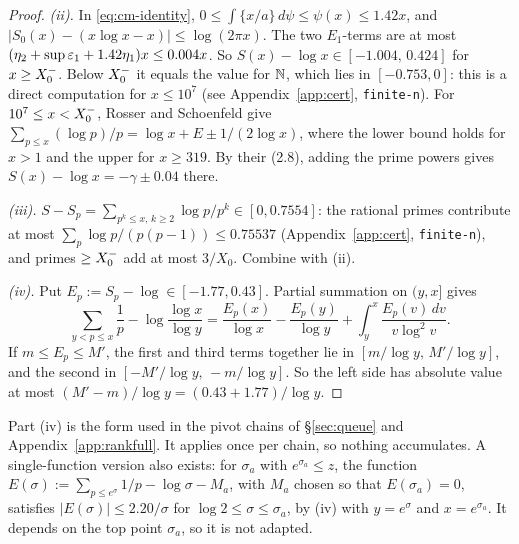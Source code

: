 \begin{proof}
\emph{(ii).} In \eqref{eq:cm-identity}, $0\le\int\{x/a\}\,d\psi\le\psi(x)\le1.42x$, and
$|S_0(x)-(x\log x-x)|\le\log(2\pi x)$. The two $E_1$-terms are at most $(\eta_2+\sup\varepsilon_1+1.42\eta_1)x\le 0.004x$. So
$S(x)-\log x\in[-1.004,\,0.424]$ for $x\ge X_0^{-}$. Below $X_0^{-}$ it equals the value for $\mathbb{N}$, which lies in $[-0.753,0]$:
this is a direct computation for $x\le10^7$ (see Appendix~\ref{app:cert}, \texttt{finite-n}). For $10^7\le x<X_0^{-}$, Rosser and Schoenfeld
\cite[(2.8) and Thm.~6, (3.21)--(3.22)]{RosserSchoenfeld1962} give
$\sum_{p\le x}(\log p)/p=\log x+E\pm1/(2\log x)$, where the lower bound holds for $x>1$ and the upper for $x\ge319$. By
their (2.8), adding the prime powers gives $S(x)-\log x=-\gamma\pm0.04$ there.

\emph{(iii).} $S-S_p=\sum_{p^k\le x,\,k\ge2}\log p/p^k\in[0,0.7554]$: the rational primes contribute at most
$\sum_p\log p/(p(p-1))\le0.75537$ (Appendix~\ref{app:cert}, \texttt{finite-n}), and primes $\ge X_0^{-}$ add at most $3/X_0$. Combine with (ii).

\emph{(iv).} Put $E_p:=S_p-\log\in[-1.77,0.43]$. Partial summation on $(y,x]$ gives
\[
  \sum_{y<p\le x}\frac1p-\log\frac{\log x}{\log y}=\frac{E_p(x)}{\log x}-\frac{E_p(y)}{\log y}
  +\int_y^x\frac{E_p(v)\,dv}{v\log^2v}.
\]
If $m\le E_p\le M'$, the first and third terms together lie in $[m/\log y,\,M'/\log y]$, and the second in
$[-M'/\log y,\,-m/\log y]$. So the left side has absolute value at most $(M'-m)/\log y=(0.43+1.77)/\log y$.
\end{proof}

\begin{remark}\label{rem:cm-chain}
Part (iv) is the form used in the pivot chains of \S\ref{sec:queue} and Appendix~\ref{app:rankfull}. It applies once
per chain, so nothing accumulates. A single-function version also exists: for $\sigma_a$ with $e^{\sigma_a}\le z$, the
function $E(\sigma):=\sum_{p\le e^\sigma}1/p-\log\sigma-M_a$, with $M_a$ chosen so that $E(\sigma_a)=0$, satisfies
$|E(\sigma)|\le 2.20/\sigma$ for $\log2\le\sigma\le\sigma_a$, by (iv) with $y=e^\sigma$ and $x=e^{\sigma_a}$. It depends on the
top point $\sigma_a$, so it is not adapted.
\end{remark}

